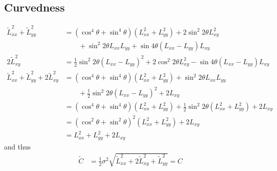 \documentclass[thesis.tex]{subfiles}
\begin{document}
\subsection{Curvedness} \label{apx:rotation_c}
%
\begin{align*}
\widetilde{L}_{xx}^2 + \widetilde{L}_{yy}^2
&= (\cos^4 \theta + \sin^4 \theta) (L_{xx}^2 + L_{yy}^2) + 2 \sin^2 2\theta L_{xy}^2 \\ &\qquad + \sin^2 2\theta L_{xx} L_{yy} + \sin 4\theta (L_{xx} - L_{yy}) L_{xy} \\
2 \widetilde{L}_{xy}^2 &= \frac12 \sin^2 2\theta (L_{xx} - L_{yy})^2 + 2 \cos^2 2\theta L_{xy}^2 - \sin 4\theta (L_{xx} - L_{yy}) L_{xy} \\
\widetilde{L}_{xx}^2 + \widetilde{L}_{yy}^2 + 2 \widetilde{L}_{xy}^2
&= (\cos^4 \theta + \sin^4 \theta) (L_{xx}^2 + L_{yy}^2) + \sin^2 2\theta L_{xx} L_{yy} \\ &\qquad + \frac12 \sin^2 2\theta (L_{xx} - L_{yy})^2 + 2 L_{xy} \\
&= (\cos^4 \theta + \sin^4 \theta) (L_{xx}^2 + L_{yy}^2) + \frac12 \sin^2 2\theta (L_{xx}^2 + L_{yy}^2) + 2 L_{xy} \\
&= (\cos^2 \theta + \sin^2 \theta)^2 (L_{xx}^2 + L_{yy}^2) + 2 L_{xy} \\
&= L_{xx}^2 + L_{yy}^2 + 2 L_{xy}
\end{align*}
%
and thus
%
\begin{align*}
\widetilde{C} &= \frac12 \sigma^2 \sqrt{\widetilde{L}_{xx}^2 + 2 \widetilde{L}_{xy}^2 + \widetilde{L}_{yy}^2} = C
\end{align*}
%
\end{document}
